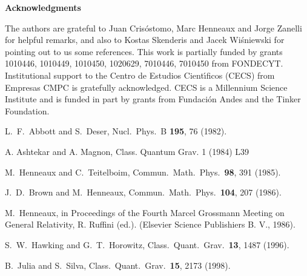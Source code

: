 \documentclass[a4paper,12pt]{article}
\begin{document}
\vskip 0.5cm \textbf{\large Acknowledgments}

The authors are grateful to Juan Cris\'ostomo, Marc Henneaux and Jorge Zanelli for
helpful remarks, and also to Kostas Skenderis and Jacek Wi\'sniewski for 
pointing out to us some references. This work is partially funded by grants 1010446, 1010449,
1010450, 1020629, 7010446, 7010450 from FONDECYT. Institutional support
 to the Centro de Estudios Cient\'{\i}ficos (CECS) from Empresas 
CMPC is gratefully acknowledged.  CECS is a Millennium Science 
Institute and is funded in part by grants from Fundaci\'{o}n Andes and 
the Tinker Foundation.

\begin{thebibliography}{99}
  L.~F.~Abbott and S.~Deser, 
Nucl.\ Phys.\ B \textbf{195}, 76 (1982). 

  A. Ashtekar and A. Magnon, Class. Quantum Grav. 1
(1984) L39

  M.~Henneaux and C.~Teitelboim, 
Commun.\ Math.\ Phys.\ \textbf{98}, 391 (1985). 

  J.~D.~Brown and M.~Henneaux, 
Commun.\ Math.\ Phys.\ \textbf{104}, 207 (1986). 


  M.~Henneaux, 
in Proceedings of the Fourth Marcel Grossmann Meeting on General Relativity,
R. Ruffini (ed.). (Elsevier Science Publishiers B. V., 1986).


  S.~W.~Hawking and G.~T.~Horowitz, 
Class.\ Quant.\ Grav.\ \textbf{13}, 1487 (1996). 


  B.~Julia and S.~Silva, 
Class.\ Quant.\ Grav.\ \textbf{15}, 2173 (1998). 



\end{thebibliography}
\end{document}
